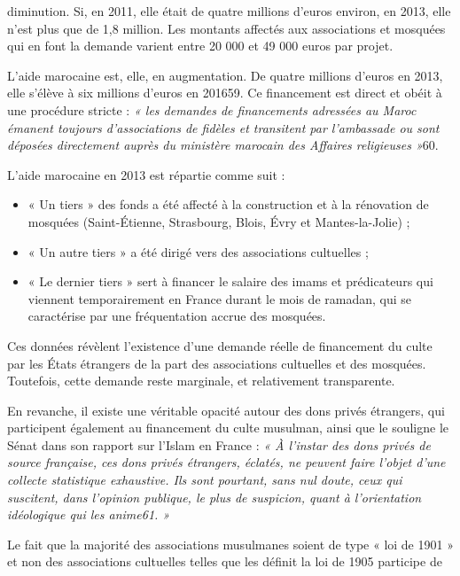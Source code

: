 diminution. Si, en 2011, elle était de quatre millions d'euros environ,
en 2013, elle n'est plus que de 1,8 million. Les montants affectés aux
associations et mosquées qui en font la demande varient entre 20 000 et
49 000 euros par projet.

L'aide marocaine est, elle, en augmentation. De quatre millions d'euros
en 2013, elle s'élève à six millions d'euros en 201659. Ce financement
est direct et obéit à une procédure stricte : \emph{« les demandes de
financements adressées au Maroc émanent toujours d'associations de
fidèles et transitent par l'ambassade ou sont déposées directement
auprès du ministère marocain des Affaires religieuses »}60.

L'aide marocaine en 2013 est répartie comme suit :


\begin{itemize}
\item
  « Un tiers » des fonds a été affecté à la construction et à la
  rénovation de mosquées (Saint-Étienne, Strasbourg, Blois, Évry et
  Mantes-la-Jolie) ;
\item
  « Un autre tiers » a été dirigé vers des associations cultuelles ;
\item
  
  « Le dernier tiers » sert à financer le salaire des imams et
  prédicateurs qui viennent temporairement en France durant le mois de
  ramadan, qui se caractérise par une fréquentation accrue des mosquées.
  
\end{itemize}


Ces données révèlent l'existence d'une demande réelle de financement du
culte par les États étrangers de la part des associations cultuelles et
des mosquées. Toutefois, cette demande reste marginale, et relativement
transparente.

En revanche, il existe une véritable opacité autour des dons privés
étrangers, qui participent également au financement du culte musulman,
ainsi que le souligne le Sénat dans son rapport sur l'Islam en France :
\emph{« À l'instar des dons privés de source française, ces dons privés
étrangers, éclatés, ne peuvent faire l'objet d'une collecte statistique
exhaustive. Ils sont pourtant, sans nul doute, ceux qui suscitent, dans
l'opinion publique, le plus de suspicion, quant à l'orientation
idéologique qui les anime61. »}

Le fait que la majorité des associations musulmanes soient de type « loi
de 1901 » et non des associations cultuelles telles que les définit la
loi de 1905 participe de

